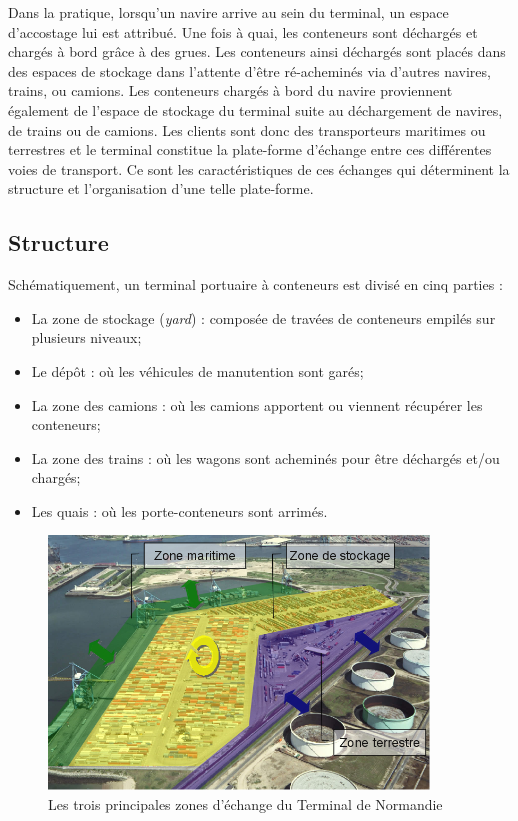


Dans la pratique, lorsqu'un navire arrive au sein du terminal, un espace d'accostage lui est attribué. Une fois à quai, les conteneurs sont déchargés et chargés à bord grâce à des grues. Les conteneurs ainsi déchargés sont placés dans des espaces de stockage dans l'attente d'être ré-acheminés via d'autres navires, trains, ou camions. Les conteneurs chargés à bord du navire proviennent également de l'espace de stockage du terminal suite au déchargement de navires, de trains ou de camions. Les clients sont donc des transporteurs maritimes ou terrestres et le terminal constitue la plate-forme d'échange entre ces différentes voies de transport. Ce sont les caractéristiques de ces échanges qui déterminent la structure et l'organisation d'une telle plate-forme.

\subsection{Structure}
Schématiquement, un terminal portuaire à conteneurs est divisé en cinq parties : 
\begin{itemize}
 \item La zone de stockage (\textit{yard}) : composée de travées de conteneurs empilés sur plusieurs niveaux;
 \item Le dépôt : où les véhicules de manutention sont garés;
 \item La zone des camions : où les camions apportent ou viennent récupérer les conteneurs;
 \item La zone des trains : où les wagons sont acheminés pour être déchargés et/ou chargés;
 \item Les quais : où les porte-conteneurs sont arrimés. 
\end{itemize}

\begin{figure}[ht]
 \label{fig:zonesTN}
 \begin{center}
 \includegraphics[width=0.9\textwidth]{chapitres/application/3zonesDuTN.png}
 \caption{Les trois principales zones d'échange du Terminal de Normandie}
 \end{center}
\end{figure}

